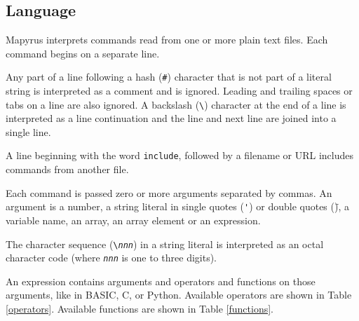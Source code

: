 \subsection{Language}

Mapyrus interprets commands read from one or more plain text files.
Each command begins on a separate line.

Any part of a line following a hash (\texttt{\#}) character that is not part of
a literal string is interpreted as a comment and is ignored.  Leading and
trailing spaces or tabs on a line are also ignored.  A backslash
(\texttt{\textbackslash}) character at the end of a line is interpreted as a
line continuation and the line and next line are joined into a single line.

A line beginning with the word \texttt{include}, followed by a filename
or URL includes commands from another file.

Each command is passed zero or more arguments separated by commas.
An argument is a number, a string literal in single quotes (\texttt{\'})
or double quotes (\texttt{\"}), a variable name, an array, an
array element or an expression.

The character sequence (\texttt{\textbackslash{}\textit{nnn}}) in
a string literal is interpreted as an octal character code (where
\texttt{\textit{nnn}} is one to three digits).

An expression contains arguments and operators and functions
on those arguments, like in BASIC, C, or Python.
Available operators are shown in Table \ref{operators}.
Available functions are shown in Table \ref{functions}.


